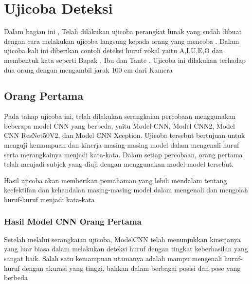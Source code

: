 \section{Ujicoba Deteksi}
Dalam bagian ini , Telah dilakukan ujicoba perangkat lunak yang sudah dibuat dengan cara melakukan ujicoba langsung kepada orang yang mencoba . Dalam ujicoba kali ini diberikan contoh deteksi huruf vokal yaitu A,I,U,E,O dan membentuk kata seperti Bapak , Ibu dan Tante . Ujicoba ini dilakukan terhadap dua orang dengan mengambil jarak 100 cm dari Kamera

\subsection{Orang Pertama}
Pada tahap ujicoba ini, telah dilakukan serangkaian percobaan menggunakan beberapa model CNN yang berbeda, yaitu Model CNN, Model CNN2, Model CNN ResNet50V2, dan Model CNN Xception. Ujicoba tersebut bertujuan untuk menguji kemampuan dan kinerja masing-masing model dalam mengenali huruf serta merangkainya menjadi kata-kata. Dalam setiap percobaan, orang pertama telah menjadi subjek yang diuji dengan menggunakan model-model tersebut. 

Hasil ujicoba akan memberikan pemahaman yang lebih mendalam tentang keefektifan dan kehandalan masing-masing model dalam mengenali dan mengolah huruf-huruf menjadi kata-kata 

\subsubsection*{Hasil Model CNN Orang Pertama}

Setelah melalui serangkaian ujicoba, ModelCNN telah menunjukkan kinerjanya yang luar biasa dalam melakukan deteksi huruf dengan tingkat keberhasilan yang sangat baik. Salah satu kemampuan utamanya adalah mampu mengenali huruf-huruf dengan akurasi yang tinggi, bahkan dalam berbagai posisi dan pose yang berbeda

